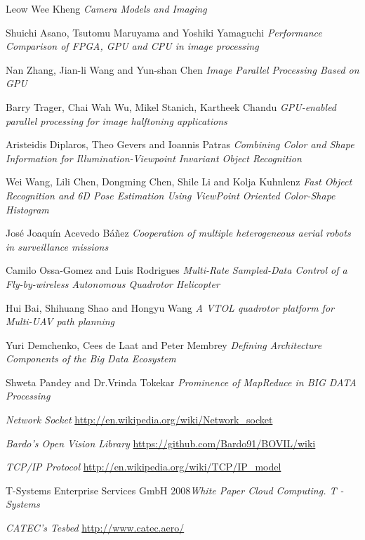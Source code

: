 \documentclass[11pt, oneside]{book} %
\begin{document}
\begin{thebibliography}{9}
  Leow Wee Kheng \textit{Camera Models and Imaging}

 Shuichi Asano, Tsutomu Maruyama and Yoshiki Yamaguchi \textit{Performance Comparison of FPGA, GPU and CPU in image processing}

 Nan Zhang, Jian-li Wang and Yun-shan Chen  \textit{Image Parallel Processing Based on GPU }

 Barry Trager, Chai Wah Wu, Mikel Stanich, Kartheek Chandu  \textit{GPU-enabled parallel processing for image halftoning applications}

  Aristeidis Diplaros, Theo Gevers and Ioannis Patras \textit{Combining Color and Shape Information for Illumination-Viewpoint Invariant Object Recognition}

 Wei Wang, Lili Chen, Dongming Chen, Shile Li and Kolja Kuhnlenz  \textit{Fast Object Recognition and 6D Pose Estimation Using ViewPoint Oriented Color-Shape Histogram}

 José Joaquín Acevedo B\'añez  \textit{Cooperation of multiple heterogeneous aerial robots in surveillance missions}

  Camilo Ossa-Gomez and Luis Rodrigues \textit{Multi-Rate Sampled-Data Control of a Fly-by-wireless Autonomous Quadrotor Helicopter}

 Hui Bai, Shihuang Shao and Hongyu Wang \textit{A VTOL quadrotor platform for Multi-UAV path planning}

 Yuri Demchenko, Cees de Laat and Peter Membrey \textit{Defining Architecture Components of the Big Data Ecosystem }

 Shweta Pandey  and Dr.Vrinda Tokekar \textit{Prominence of MapReduce in BIG DATA Processing}

\bibitem{}   \textit{}

 \textit{Network Socket} \url{http://en.wikipedia.org/wiki/Network_socket}

 \textit{Bardo's Open Vision Library} \url{https://github.com/Bardo91/BOVIL/wiki}

 \textit{TCP/IP Protocol}  \url{http://en.wikipedia.org/wiki/TCP/IP_model}

 T-Systems Enterprise Services GmbH 2008\textit{White Paper Cloud Computing. T - Systems} 

 \textit {CATEC's Tesbed} \url{http://www.catec.aero/}

\end{thebibliography}

\backmatter
\end{document}
